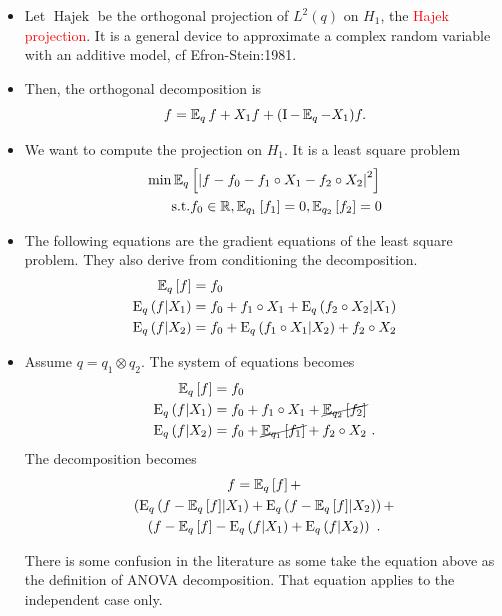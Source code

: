 \documentclass[xcolor=svgnames]{beamer}
\DeclareMathOperator{\Hajek}{Hajek}
\newcommand{\rosso}[1]{\textcolor{red}{#1}}
\renewcommand{\emph}{\rosso}
\begin{document}
\begin{frame}
\begin{itemize}
    \item Let $\Hajek$ be the orthogonal projection of $L^2(q)$ on $H_1$, the \emph{Hajek projection}. It is a general device to approximate a complex random variable with an additive model, cf Efron-Stein:1981. 
    \item Then, the orthogonal decomposition is 
    \begin{equation*}
        f = \operatorname{\mathbb E}_q f + X_1 f + (\operatorname I  - 
 \operatorname{\mathbb E}_q - X_1) f  .
    \end{equation*}
    \item We want to compute the projection on $H_1$. It is a least square problem
    \begin{align*}
    \min& \operatorname{\mathbb E}_{q}\left[\left\vert f - f_0 - f_1\circ X_1 - f_2\circ X_2\right\vert^2\right] \\    
    &\text{s.t.} f_0 \in \mathbb{R}, \operatorname{\mathbb E}_{q_1}\left[f_1\right] = 0, \operatorname{\mathbb E}_{q_2}\left[f_2\right] = 0
    \end{align*}
    \item The following equations are the gradient equations of the least square problem. They also derive from conditioning the decomposition.
    \begin{align*}
        \operatorname{\mathbb E}_{q}\left[f\right] &= f_0 \\
        \operatorname{E}_{q}\left(f \middle| X_1\right) &= f_0 + f_1\circ X_1 + \operatorname{E}_{q}\left(f_2 \circ X_2 \middle| X_1\right) \\ 
            \operatorname{E}_{q}\left(f \middle| X_2\right) &= f_0 + \operatorname{E}_{q}\left(f_1 \circ X_1 \middle| X_2\right) + f_2\circ X_2
        \end{align*}
        \item Assume $q =q_1 \otimes q_2$. The system of equations becomes
 \begin{align*}
        \operatorname{\mathbb E}_{q}\left[f\right] &= f_0 \\
        \operatorname{E}_{q}\left(f \middle| X_1\right) &= f_0 + f_1\circ X_1 + \cancel{\operatorname{\mathbb E}_{q_2}\left[f_2\right]} \\ 
            \operatorname{E}_{q}\left(f \middle| X_2\right) &= f_0 + \cancel{\operatorname{\mathbb E}_{q_1}\left[f_1\right]} + f_2\circ X_2 \ .
        \end{align*} 
The decomposition becomes
\begin{multline*}
f = \operatorname{\mathbb E}_{q}\left[f\right] + \\
\left(\operatorname{E}_{q}\left(f - \operatorname{\mathbb E}_{q}\left[f\right] \middle| X_1\right) + \operatorname{E}_{q}\left(f - \operatorname{\mathbb E}_{q}\left[f\right] \middle| X_2\right)\right) + \\ 
\left(f - \operatorname{\mathbb E}_{q}\left[f\right] - \operatorname{E}_{q}\left(f \middle| X_1\right) + \operatorname{E}_{q}\left(f  \middle| X_2\right)\right) \ .
\end{multline*}

There is some confusion in the literature as some take the equation above as the definition of ANOVA decomposition. That equation applies to the independent case only.


\end{itemize}
\end{frame}
\end{document}
